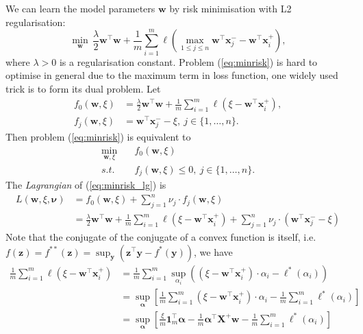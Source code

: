 \documentclass[9pt]{extarticle}
\newcommand{\x}{\mathbf{x}}
\newcommand{\X}{\mathbf{X}}
\newcommand{\y}{\mathbf{y}}
\newcommand{\z}{\mathbf{z}}
\newcommand{\1}{\mathbf{1}}
\newcommand{\w}{\mathbf{w}}
\newcommand{\alphabm}{\bm{\alpha}}
\newcommand{\nubm}{\bm{\nu}}
\newcommand{\ie}{i.e.\ }
\begin{document}
We can learn the model parameters $\w$ by risk minimisation with L2 regularisation:
\begin{equation}
\label{eq:minrisk}
\min_{\w} \, \frac{\lambda}{2} \w^\top \w + \frac{1}{m} \sum_{i=1}^m \ell\left( \max_{1 \le j \le n} \w^\top \x_j^- - \w^\top \x_i^+ \right),
\end{equation}
where $\lambda > 0$ is a regularisation constant.
Problem (\ref{eq:minrisk}) is hard to optimise in general due to the maximum term in loss function, one widely used trick is to form its dual problem.
Let 
\begin{equation*}
\begin{aligned}
f_0 (\w, \xi) &= \frac{\lambda}{2} \w^\top \w + \frac{1}{m} \sum_{i=1}^m \ell\left( \xi - \w^\top \x_i^+ \right), \\
f_j (\w, \xi) &= \w^\top \x_j^- - \xi, \ j \in \{1,\dots,n\}.
\end{aligned}
\end{equation*}
Then problem (\ref{eq:minrisk}) is equivalent to
\begin{equation}
\label{eq:minrisk_lg}
\begin{aligned}
\min_{\w, \xi} \quad & f_0 (\w, \xi) \\
s.t. \quad & f_j (\w, \xi) \le 0, \ j \in \{1,\dots,n\}.
\end{aligned}
\end{equation}
The \emph{Lagrangian} of (\ref{eq:minrisk_lg}) is
\begin{equation}
\label{eq:minrisk_lg1}
\begin{aligned}
L(\w, \xi, \nubm) 
&= f_0 (\w, \xi) + \sum_{j=1}^n \nu_j \cdot f_j(\w, \xi) \\
&= \frac{\lambda}{2} \w^\top \w + \frac{1}{m} \sum_{i=1}^m \ell\left( \xi - \w^\top \x_i^+ \right) + \sum_{j=1}^n \nu_j \cdot \left( \w^\top \x_j^- - \xi \right)
\end{aligned}
\end{equation}
Note that the conjugate of the conjugate of a convex function is itself, \ie $f(\z) = f^{**}(\z) = \sup_{\y} \left( \z^\top \y - f^*(\y) \right)$, we have
\begin{equation}
\label{eq:lg_part1}
\begin{aligned}
\frac{1}{m} \sum_{i=1}^m \ell\left( \xi - \w^\top \x_i^+ \right)
&= \frac{1}{m} \sum_{i=1}^m \sup_{\alpha_i} \left( (\xi - \w^\top \x_i^+) \cdot \alpha_i - \ell^*(\alpha_i) \right) \\
&= \sup_{\alphabm} \left[ \frac{1}{m} \sum_{i=1}^m (\xi - \w^\top \x_i^+) \cdot \alpha_i - \frac{1}{m} \sum_{i=1}^m \ell^*(\alpha_i) \right] \\
&= \sup_{\alphabm} \left[ \frac{\xi}{m} \1_m^\top \alphabm - \frac{1}{m} \alphabm^\top \X^+ \w - \frac{1}{m} \sum_{i=1}^m \ell^*(\alpha_i) \right] \\
\end{aligned}
\end{equation}
\end{document}
